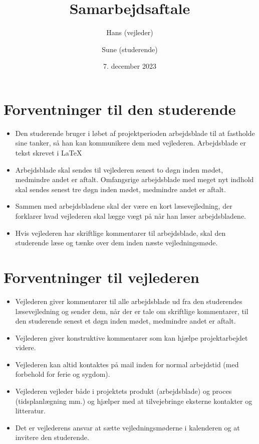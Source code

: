 \documentclass{article}
\title{Samarbejdsaftale}
\author{Hans (vejleder) \and Sune (studerende)}
\date{7. december 2023}
\begin{document}
\maketitle

\section{Forventninger til den studerende}

\begin{itemize}
    \item Den studerende bruger i løbet af projektperioden arbejdsblade til at fastholde sine tanker, så han kan kommunikere dem med vejlederen. Arbejdsblade er tekst skrevet i \LaTeX
    \item Arbejdsblade skal sendes til vejlederen senest to døgn inden mødet, medmindre andet er aftalt. Omfangsrige arbejdsblade med meget nyt indhold skal sendes senest tre døgn inden mødet, medmindre andet er aftalt.
    \item Sammen med arbejdsbladene skal der være en kort læsevejledning, der forklarer hvad vejlederen skal lægge vægt på når han læser arbejdsbladene.
    \item Hvis vejlederen har skriftlige kommentarer til arbejdsblade, skal den studerende læse og tænke over dem inden næste vejledningsmøde.
\end{itemize}

\section{Forventninger til vejlederen}
\begin{itemize}
    \item Vejlederen giver kommentarer til alle arbejdsblade ud fra den studerendes læsevejledning og sender dem, når der er tale om skriftlige kommentarer, til den studerende senest et døgn inden mødet, medmindre andet er aftalt.

    \item Vejlederen giver konstruktive kommentarer som kan hjælpe projektarbejdet videre.

    \item Vejlederen kan altid kontaktes på mail inden for normal arbejdstid (med forbehold for ferie og sygdom).

    \item Vejlederen vejleder både i projektets produkt (arbejdsblade) og proces (tidsplanlægning mm.) og hjælper med at tilvejebringe eksterne kontakter og litteratur.

    \item Det er vejlederens ansvar at sætte vejledningsmøderne i kalenderen og at invitere den studerende.
\end{itemize}
\end{document}
